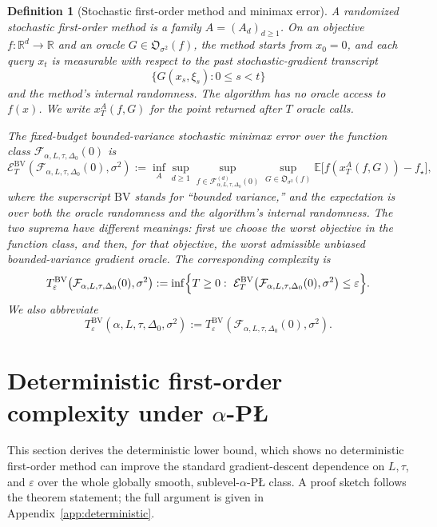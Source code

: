 \documentclass[11pt]{article}
\newtheorem{definition}[theorem]{Definition}
\newcommand{\R}{\mathbb{R}}
\newcommand{\E}{\mathbb{E}}
\begin{document}
\begin{definition}[Stochastic first-order method and minimax error]
\label{def:stochastic-model}
A randomized stochastic first-order method is a family \(A=(A_d)_{d\ge 1}\). On an objective \(f:\R^d\to\R\) and an
oracle \(G\in\mathfrak O_{\sigma^2}(f)\), the method starts from \(x_0=0\), and each query \(x_t\) is measurable with
respect to the past stochastic-gradient transcript
\[
\{G(x_s,\xi_s):0\le s<t\}
\]
and the method's internal randomness. The algorithm has no oracle access to \(f(x)\). We write \(x_T^A(f,G)\) for the
point returned after \(T\) oracle calls.

The fixed-budget bounded-variance stochastic minimax error over the function class
\(\mathcal F_{\alpha,L,\tau,\Delta_0}(0)\) is
\[
\mathcal E_T^{\mathrm{BV}}\!\left(\mathcal F_{\alpha,L,\tau,\Delta_0}(0),\sigma^2\right)
:=
\inf_A
\sup_{d\ge 1}
\sup_{f\in\mathcal F^{(d)}_{\alpha,L,\tau,\Delta_0}(0)}
\sup_{G\in\mathfrak O_{\sigma^2}(f)}
\E\bigl[f(x_T^A(f,G))-f_\star\bigr],
\]
where the superscript $\mathrm{BV}$ stands for ``bounded variance,'' and the expectation is over both the oracle
randomness and the algorithm's internal randomness. The two suprema have different meanings: first we choose the worst
objective in the function class, and then, for that objective, the worst admissible unbiased bounded-variance gradient
oracle.
The corresponding complexity is
\[
T_\varepsilon^{\mathrm{BV}}\!\left(\mathcal F_{\alpha,L,\tau,\Delta_0}(0),\sigma^2\right)
:=
\inf\Bigl\{T\ge 0:\
\mathcal E_T^{\mathrm{BV}}\!\left(\mathcal F_{\alpha,L,\tau,\Delta_0}(0),\sigma^2\right)\le \varepsilon
\Bigr\}.
\]
We also abbreviate
\[
T_\varepsilon^{\mathrm{BV}}(\alpha,L,\tau,\Delta_0,\sigma^2)
:=
T_\varepsilon^{\mathrm{BV}}\!\left(\mathcal F_{\alpha,L,\tau,\Delta_0}(0),\sigma^2\right).
\]
\end{definition}

\section{\texorpdfstring{Deterministic first-order complexity under $\alpha$-P\L{}}{Deterministic first-order complexity under alpha-PL}}
\label{sec:det}

This section derives the deterministic lower bound, which shows no deterministic first-order
method can improve the standard gradient-descent dependence on \(L,\tau\), and \(\varepsilon\) over the whole globally
smooth, sublevel-\(\alpha\)-P\L{} class. %
A proof sketch follows the theorem statement; the full argument is given in
Appendix~\ref{app:deterministic}.
\end{document}
